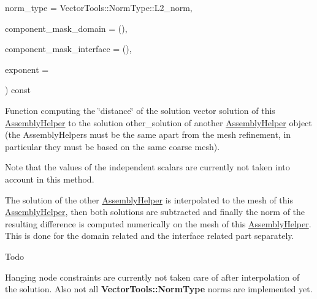 {\begin{DoxyParamCaption}
\item[{const {\bf Vector\+Tools\+::\+Norm\+Type}}]{norm\+\_\+type = {\ttfamily VectorTools\+:\+:NormType\+:\+:L2\+\_\+norm}, }
\item[{const {\bf Component\+Mask}}]{component\+\_\+mask\+\_\+domain = {()}, }
\item[{const {\bf Component\+Mask}}]{component\+\_\+mask\+\_\+interface = {()}, }
\item[{const double}]{exponent = {}}
\end{DoxyParamCaption}
) const}\hypertarget{class_assembly_helper_ac7860831588d35d05009474f2a695e14}{}\label{class_assembly_helper_ac7860831588d35d05009474f2a695e14}
Function computing the \char`\"{}distance\char`\"{} of the solution vector {\ttfamily solution} of this \hyperlink{class_assembly_helper}{Assembly\+Helper} to the solution {\ttfamily other\+\_\+solution} of another \hyperlink{class_assembly_helper}{Assembly\+Helper} object (the Assembly\+Helpers must be the same apart from the mesh refinement, in particular they must be based on the same coarse mesh).

Note that the values of the independent scalars are currently not taken into account in this method.

The solution of the other \hyperlink{class_assembly_helper}{Assembly\+Helper} is interpolated to the mesh of this \hyperlink{class_assembly_helper}{Assembly\+Helper}, then both solutions are subtracted and finally the norm of the resulting difference is computed numerically on the mesh of this \hyperlink{class_assembly_helper}{Assembly\+Helper}. This is done for the domain related and the interface related part separately.

\begin{DoxyRefDesc}{Todo}
\item[\hyperlink{todo__todo000007}{Todo}]Hanging node constraints are currently not taken care of after interpolation of the solution. Also not all {\bf Vector\+Tools\+::\+Norm\+Type} norms are implemented yet.\end{DoxyRefDesc}



